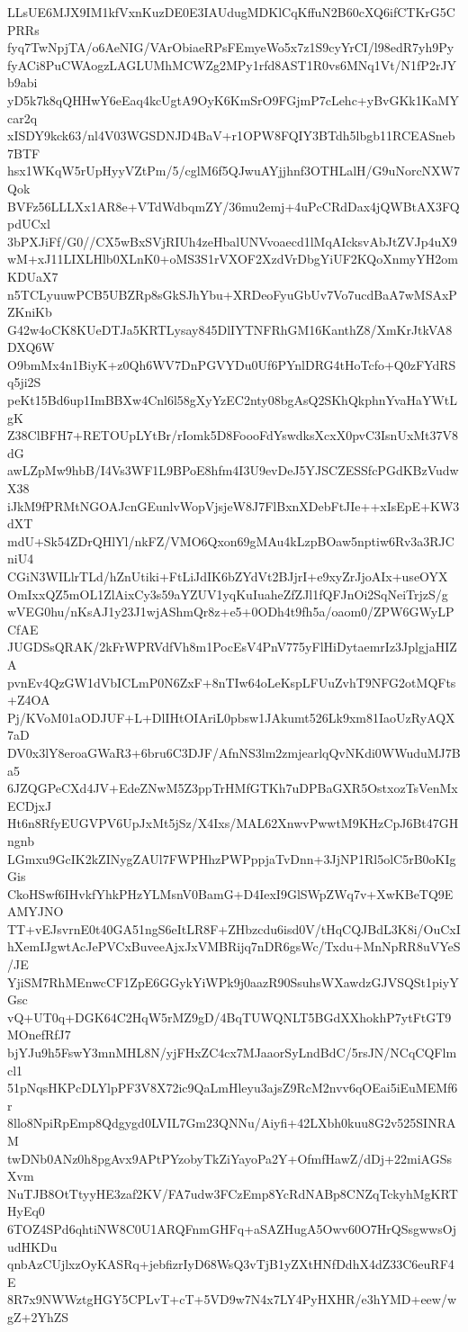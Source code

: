 LLsUE6MJX9IM1kfVxnKuzDE0E3IAUdugMDKlCqKffuN2B60cXQ6ifCTKrG5CPRRs
fyq7TwNpjTA/o6AeNIG/VArObiaeRPsFEmyeWo5x7z1S9cyYrCI/l98edR7yh9Py
fyACi8PuCWAogzLAGLUMhMCWZg2MPy1rfd8AST1R0vs6MNq1Vt/N1fP2rJYb9abi
yD5k7k8qQHHwY6eEaq4kcUgtA9OyK6KmSrO9FGjmP7cLehc+yBvGKk1KaMYcar2q
xISDY9kck63/nl4V03WGSDNJD4BaV+r1OPW8FQIY3BTdh5lbgb11RCEASneb7BTF
hsx1WKqW5rUpHyyVZtPm/5/cglM6f5QJwuAYjjhnf3OTHLalH/G9uNorcNXW7Qok
BVFz56LLLXx1AR8e+VTdWdbqmZY/36mu2emj+4uPcCRdDax4jQWBtAX3FQpdUCxl
3bPXJiFf/G0//CX5wBxSVjRIUh4zeHbalUNVvoaecd1lMqAIcksvAbJtZVJp4uX9
wM+xJ11LIXLHlb0XLnK0+oMS3S1rVXOF2XzdVrDbgYiUF2KQoXnmyYH2omKDUaX7
n5TCLyuuwPCB5UBZRp8sGkSJhYbu+XRDeoFyuGbUv7Vo7ucdBaA7wMSAxPZKniKb
G42w4oCK8KUeDTJa5KRTLysay845DlIYTNFRhGM16KanthZ8/XmKrJtkVA8DXQ6W
O9bmMx4n1BiyK+z0Qh6WV7DnPGVYDu0Uf6PYnlDRG4tHoTcfo+Q0zFYdRSq5ji2S
peKt15Bd6up1ImBBXw4Cnl6l58gXyYzEC2nty08bgAsQ2SKhQkphnYvaHaYWtLgK
Z38ClBFH7+RETOUpLYtBr/rIomk5D8FoooFdYswdksXcxX0pvC3IsnUxMt37V8dG
awLZpMw9hbB/I4Vs3WF1L9BPoE8hfm4I3U9evDeJ5YJSCZESSfcPGdKBzVudwX38
iJkM9fPRMtNGOAJcnGEunlvWopVjsjeW8J7FlBxnXDebFtJIe++xIsEpE+KW3dXT
mdU+Sk54ZDrQHlYl/nkFZ/VMO6Qxon69gMAu4kLzpBOaw5nptiw6Rv3a3RJCniU4
CGiN3WILlrTLd/hZnUtiki+FtLiJdIK6bZYdVt2BJjrI+e9xyZrJjoAIx+useOYX
OmIxxQZ5mOL1ZlAixCy3s59aYZUV1yqKuIuaheZfZJl1fQFJnOi2SqNeiTrjzS/g
wVEG0hu/nKsAJ1y23J1wjAShmQr8z+e5+0ODh4t9fh5a/oaom0/ZPW6GWyLPCfAE
JUGDSsQRAK/2kFrWPRVdfVh8m1PocEsV4PnV775yFlHiDytaemrIz3JplgjaHIZA
pvnEv4QzGW1dVbICLmP0N6ZxF+8nTIw64oLeKspLFUuZvhT9NFG2otMQFts+Z4OA
Pj/KVoM01aODJUF+L+DlIHtOIAriL0pbsw1JAkumt526Lk9xm81IaoUzRyAQX7aD
DV0x3lY8eroaGWaR3+6bru6C3DJF/AfnNS3lm2zmjearlqQvNKdi0WWuduMJ7Ba5
6JZQGPeCXd4JV+EdeZNwM5Z3ppTrHMfGTKh7uDPBaGXR5OstxozTsVenMxECDjxJ
Ht6n8RfyEUGVPV6UpJxMt5jSz/X4Ixs/MAL62XnwvPwwtM9KHzCpJ6Bt47GHngnb
LGmxu9GcIK2kZINygZAUl7FWPHhzPWPppjaTvDnn+3JjNP1Rl5olC5rB0oKIgGis
CkoHSwf6IHvkfYhkPHzYLMsnV0BamG+D4IexI9GlSWpZWq7v+XwKBeTQ9EAMYJNO
TT+vEJsvrnE0t40GA51ngS6eItLR8F+ZHbzcdu6isd0V/tHqCQJBdL3K8i/OuCxI
hXemIJgwtAcJePVCxBuveeAjxJxVMBRijq7nDR6gsWc/Txdu+MnNpRR8uVYeS/JE
YjiSM7RhMEnwcCF1ZpE6GGykYiWPk9j0aazR90SsuhsWXawdzGJVSQSt1piyYGsc
vQ+UT0q+DGK64C2HqW5rMZ9gD/4BqTUWQNLT5BGdXXhokhP7ytFtGT9MOnefRfJ7
bjYJu9h5FswY3mnMHL8N/yjFHxZC4cx7MJaaorSyLndBdC/5rsJN/NCqCQFlmcl1
51pNqsHKPcDLYlpPF3V8X72ic9QaLmHleyu3ajsZ9RcM2nvv6qOEai5iEuMEMf6r
8llo8NpiRpEmp8Qdgygd0LVIL7Gm23QNNu/Aiyfi+42LXbh0kuu8G2v525SINRAM
twDNb0ANz0h8pgAvx9APtPYzobyTkZiYayoPa2Y+OfmfHawZ/dDj+22miAGSsXvm
NuTJB8OtTtyyHE3zaf2KV/FA7udw3FCzEmp8YcRdNABp8CNZqTckyhMgKRTHyEq0
6TOZ4SPd6qhtiNW8C0U1ARQFnmGHFq+aSAZHugA5Owv60O7HrQSsgwwsOjudHKDu
qnbAzCUjlxzOyKASRq+jebfizrIyD68WsQ3vTjB1yZXtHNfDdhX4dZ33C6euRF4E
8R7x9NWWztgHGY5CPLvT+cT+5VD9w7N4x7LY4PyHXHR/e3hYMD+eew/wgZ+2YhZS
